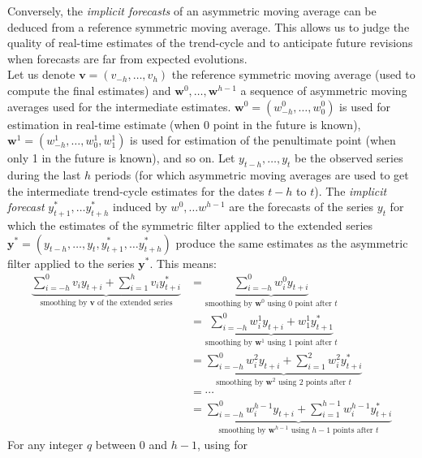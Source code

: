 \documentclass[
]{article}
\newcommand\1{\mathds{1}}
\begin{document}
Conversely, the \emph{implicit forecasts} of an asymmetric moving
average can be deduced from a reference symmetric moving average. This
allows us to judge the quality of real-time estimates of the trend-cycle
and to anticipate future revisions when forecasts are far from expected
evolutions.\\
Let us denote \(\boldsymbol v=(v_{-h},\dots, v_{h})\) the reference
symmetric moving average (used to compute the final estimates) and
\(\boldsymbol w^0,\dots, \boldsymbol w^{h-1}\) a sequence of asymmetric
moving averages used for the intermediate estimates.
\(\boldsymbol w^0=(w_{-h}^0, \dots, w_{0}^0)\) is used for estimation in
real-time estimate (when 0 point in the future is known),
\(\boldsymbol w^1=(w_{-h}^1, \dots, w_{0}^1, w_{1}^1)\) is used for
estimation of the penultimate point (when only 1 in the future is
known), and so on. Let \(y_{t-h},\dots,y_{t}\) be the observed series
during the last \(h\) periods (for which asymmetric moving averages are
used to get the intermediate trend-cycle estimates for the dates \(t-h\)
to \(t\)). The \emph{implicit forecast} \(y_{t+1}^*,\dots y_{t+h}^*\)
induced by \(w^0,\dots w^{h-1}\) are the forecasts of the series \(y_t\)
for which the estimates of the symmetric filter applied to the extended
series
\(\boldsymbol y^* = (y_{t-h}, \dots, y_t, y_{t+1}^*,\dots y_{t+h}^*)\)
produce the same estimates as the asymmetric filter applied to the
series \(\boldsymbol y^*\). This means: \begin{align*}
\underbrace{\sum_{i=-h}^0 v_iy_{t+i} + \sum_{i=1}^h v_iy_{t+i}^*}_{\text{smoothing by }\boldsymbol v\text{ of the extended series}} &=
\underbrace{\sum_{i=-h}^0 w_i^0y_{t+i}}_{\text{smoothing by }\boldsymbol w^0\text{ using }0\text{ point after }t} \\
&=
\underbrace{\sum_{i=-h}^0 w_i^1y_{t+i} + w_1^1y_{t+1}^*}_{\text{smoothing by }\boldsymbol w^1\text{ using }1\text{ point after }t} \\
&= \underbrace{\sum_{i=-h}^0 w_i^2y_{t+i} + \sum_{i=1}^{2}w_i^2y_{t+i}^*}_{\text{smoothing by }\boldsymbol w^2\text{ using }2\text{ points after }t} \\
&= \cdots \\
&=\underbrace{\sum_{i=-h}^0 w_i^{h-1}y_{t+i} + \sum_{i=1}^{h-1} w_i^{h-1}y_{t+i}^*}_{\text{smoothing by }\boldsymbol w^{h-1}\text{ using }h-1\text{ points after }t}
\end{align*} For any integer \(q\) between 0 and \(h-1\), using for
\end{document}
